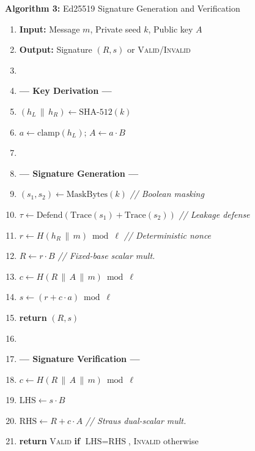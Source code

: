 \documentclass[journal, 10pt, twocolumn]{IEEEtran}
\begin{document}
\begin{figure}[!t]
\hrulefill
\vspace{-0.2cm}
\begin{center}
\textbf{Algorithm 3:} Ed25519 Signature Generation and Verification
\end{center}
\vspace{-0.2cm}
\hrulefill
\begin{enumerate}
    \item \textbf{Input:} Message $m$, Private seed $k$, Public key $A$
    \item \textbf{Output:} Signature $(R, s)$ or \textsc{Valid}/\textsc{Invalid}
    \item[]
    \item[] \textbf{--- Key Derivation ---}
    \item $(h_L \,\|\, h_R) \leftarrow \text{SHA-512}(k)$
    \item $a \leftarrow \text{clamp}(h_L)$; \quad $A \leftarrow a \cdot B$
    \item[]
    \item[] \textbf{--- Signature Generation ---}
    \item $(s_1, s_2) \leftarrow \text{MaskBytes}(k)$ \quad \textit{// Boolean masking}
    \item $\tau \leftarrow \text{Defend}(\text{Trace}(s_1) + \text{Trace}(s_2))$ \quad \textit{// Leakage defense}
    \item $r \leftarrow H(h_R \,\|\, m) \bmod \ell$ \quad \textit{// Deterministic nonce}
    \item $R \leftarrow r \cdot B$ \quad \textit{// Fixed-base scalar mult.}
    \item $c \leftarrow H(R \,\|\, A \,\|\, m) \bmod \ell$
    \item $s \leftarrow (r + c \cdot a) \bmod \ell$
    \item \textbf{return} $(R, s)$
    \item[]
    \item[] \textbf{--- Signature Verification ---}
    \item $c \leftarrow H(R \,\|\, A \,\|\, m) \bmod \ell$
    \item $\text{LHS} \leftarrow s \cdot B$
    \item $\text{RHS} \leftarrow R + c \cdot A$ \quad \textit{// Straus dual-scalar mult.}
    \item \textbf{return} \textsc{Valid} \textbf{if} $\text{LHS} = \text{RHS}$, \textsc{Invalid} otherwise
\end{enumerate}
\hrulefill
\end{figure}
\end{document}
